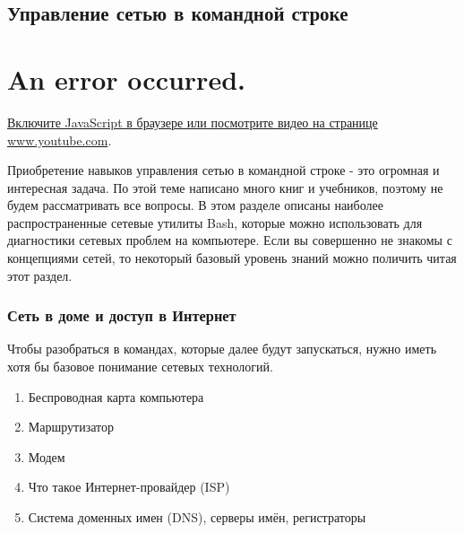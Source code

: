 \documentclass{report}
\begin{document}
\hypertarget{Networking-on-Command-Line}{%
\subsection{\texorpdfstring{\protect\hyperlink{Networking-on-Command-Line}{}Управление
сетью в командной
строке}{Управление сетью в командной строке}}\label{Networking-on-Command-Line}}

\hypertarget{player}{}

\hypertarget{an-error-occurred.}{%
\section{An error occurred.}\label{an-error-occurred.}}

\href{https://www.youtube.com/watch?v=hGjF90P1Hr0}{Включите JavaScript в
браузере или посмотрите видео на странице www.youtube.com}.

Приобретение навыков управления сетью в командной строке - это огромная
и интересная задача. По этой теме написано много книг и учебников,
поэтому не будем рассматривать все вопросы. В этом разделе описаны
наиболее распространенные сетевые утилиты Bash, которые можно
использовать для диагностики сетевых проблем на компьютере. Если вы
совершенно не знакомы с концепциями сетей, то некоторый базовый уровень
знаний можно поличить читая этот раздел.

\hypertarget{Your-home-network-and-the-internet}{%
\subsubsection{\texorpdfstring{\protect\hyperlink{Your-home-network-and-the-internet}{}Сеть
в доме и доступ в
Интернет}{Сеть в доме и доступ в Интернет}}\label{Your-home-network-and-the-internet}}

Чтобы разобраться в командах, которые далее будут запускаться, нужно
иметь хотя бы базовое понимание сетевых технологий.

\begin{enumerate}
\tightlist
\item
  Беспроводная карта компьютера
\item
  Маршрутизатор
\item
  Модем
\item
  Что такое Интернет-провайдер (ISP)
\item
  Система доменных имен (DNS), серверы имён, регистраторы
\end{enumerate}
\end{document}
